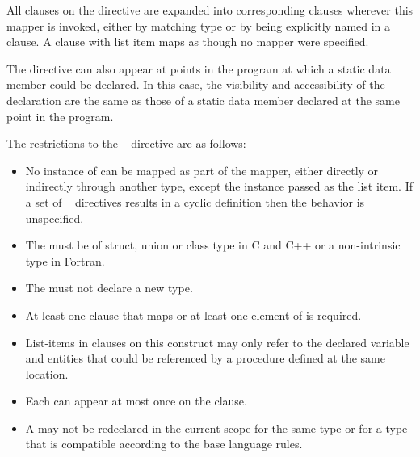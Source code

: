 All  clauses on the directive are expanded into corresponding
 clauses wherever this mapper is invoked, either by matching type or
by being explicitly named in a  clause. A  clause with list item
 maps  as though no mapper were specified.

\begin{cppspecific}
The  directive can also appear at points in the program at
which a static data member could be declared. In this case, the visibility and
accessibility of the declaration are the same as those of a static data member
declared at the same point in the program.
\end{cppspecific}

\restrictions
The restrictions to the ~ directive are as follows:

\begin{itemize}
\item No instance of  can be mapped as part of the mapper, either
      directly or indirectly through another type, except the instance passed as the
      list item. If a set of ~ directives results in a
      cyclic definition then the behavior is unspecified.
\item The  must be of struct, union or class type in C and C++ or a
      non-intrinsic type in Fortran.
\item The  must not declare a new type.
\item At least one  clause that maps  or at least one element
      of  is required.
\item List-items in  clauses on this construct may only refer to the
      declared variable  and entities that could be referenced by a
      procedure defined at the same location.
\item Each  can appear at most once on the
       clause.
\item A  may not be redeclared in the current scope for the 
      same type or for a type that is compatible according to the base language rules.

\end{itemize}
